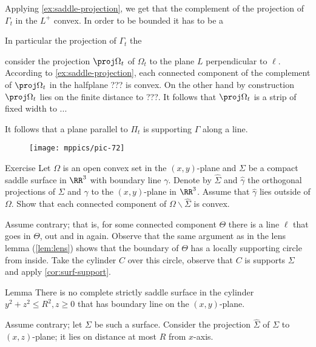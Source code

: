 Applying \ref{ex:saddle-projection}, we get that the complement of the projection of $\Gamma_t$ in the $L^+$ convex. 
In order to be bounded it has to be a 


In particular the projection of $\Gamma_t$ the 

consider the projection $\proj\Omega_t$ of $\Omega_t$ to the plane $L$ perpendicular to $\ell$.
According to \ref{ex:saddle-projection},
each connected component of the complement of $\proj\Omega_t$  in the halfplane ??? is convex.
On the other hand by construction $\proj\Omega_t$ lies on the finite distance to ???.
It follows that $\proj\Omega_t$ is a strip of fixed width to ...

It follows that a plane parallel to $\Pi_t$ is supporting $\Gamma$ along a line.

\qeds

\begin{wrapfigure}{o}{40 mm}
\vskip-0mm
\centering
\texttt{[image: mppics/pic-72]}
\vskip0mm
\end{wrapfigure}

\begin{thm}{Exercise}\label{ex:saddle-projection}
Let $\Omega$ is an open convex set in the $(x,y)$-plane and 
$\Sigma$ be a compact saddle surface in $\RR^3$ with boundary line $\gamma$.
Denote by $\hat \Sigma$ and $\hat\gamma$ the orthogonal projections of $\Sigma$ and $\gamma$ to the $(x,y)$-plane in $\RR^3$.
Assume that $\hat\gamma$ lies outside of $\Omega$.
Show that each connected component of $\Omega\backslash \hat\Sigma$ is convex. 
\end{thm}


Assume contrary; that is, for some connected component $\Theta$ there is a line $\ell$ that goes in $\Theta$, out and in again.
Observe that the same argument as in the lens lemma (\ref{lem:lens}) shows that the boundary of $\Theta$ has a locally supporting circle from inside.
Take the cylinder $C$ over this circle, observe that $C$ is supports $\Sigma$ and apply \ref{cor:surf-support}.

\begin{thm}{Lemma}
There is no complete strictly saddle surface in the cylinder $y^2+z^2\le R^2, z\ge 0$ that has boundary line on the $(x,y)$-plane.
\end{thm}

Assume contrary; let $\Sigma$ be such a surface.
Consider the projection $\hat\Sigma$ of $\Sigma$ to $(x,z)$-plane;
it lies on distance at most $R$ from $x$-axis.

